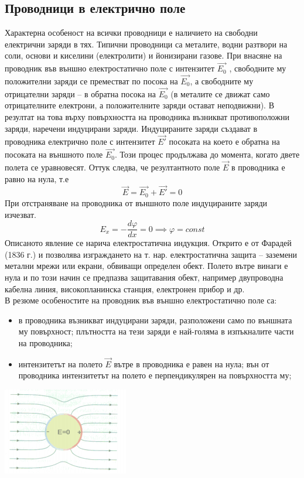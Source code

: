 \documentclass[fleqn, 12pt]{article}
\theoremstyle{definition}
\begin{document}
\subsection{Проводници в електрично поле} 
Характерна особеност на всички
проводници е наличието на свободни
електрични заряди в тях. Типични проводници
са металите, водни разтвори на соли, основи и
киселини (електролити) и йонизирани газове.
При внасяне на проводник във външно
електростатично поле с интензитет $\vec{E_0}$ ,
свободните му положителни заряди се
преместват по посока на $\vec{E_0}$, а свободните му
отрицателни заряди – в обратна посока на $\vec{E_0}$ (в
металите се движат само отрицателните електрони, а положителните заряди остават
неподвижни). В резултат на това върху повърхността на проводника възникват
противоположни заряди, наречени индуцирани заряди. Индуцираните заряди създават в
проводника електрично поле с интензитет $\vec{E'}$ посоката на което е обратна на посоката
на външното поле $\vec{E_0}$. Този процес продължава до момента, когато двете полета се
уравновесят. Оттук следва, че резултантното поле $\vec{E}$ в проводника е равно на нула, т.е
$$\vec{E} = \vec{E_0} + \vec{E'} = 0$$
При отстраняване на проводника от външното поле индуцираните заряди
изчезват.\\
$$E_x = - \frac{d \varphi}{dx} = 0 \implies \varphi = const$$
Описаното явление се нарича електростатична индукция. Открито е от Фарадей
(1836 г.) и позволява изграждането на т. нар. електростатична защита – заземени
метални мрежи или екрани, обвиващи определен обект. Полето вътре винаги е нула и
по този начин се предпазва защитавания обект, например двупроводна кабелна линия,
високопланинска станция, електронен прибор и др. \\
В резюме особеностите на проводник във външно електростатично поле са:
\begin{itemize}
\item в проводника възникват индуцирани заряди, разположени само по външната му
повърхност; плътността на тези заряди е най-голяма в изпъкналите части на
проводника;
\item интензитетът на полето $\vec{E}$ вътре в проводника е равен на нула; вън от
проводника интензитетът на полето е перпендикулярен на повърхността му;
\end{itemize}

\begin{center}
  \includegraphics{Pics/physics/lec6-8.png}
\end{center}
\end{document}
